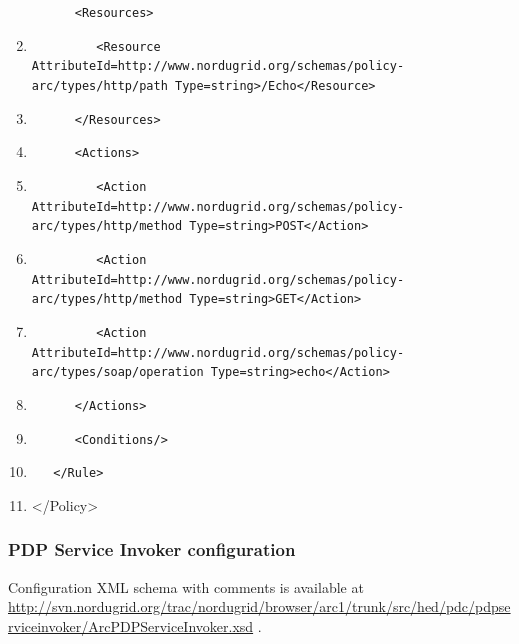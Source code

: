 \documentclass{article}
\begin{document}
\begin{enumerate}
{\texttt{\ \ \ \ \ \ {\textless}Resources{\textgreater}}}
\item {\color{black}
\texttt{\ \ \ \ \ \ \ \ \ {\textless}Resource
AttributeId={\textquotedbl}http://www.nordugrid.org/schemas/policy-arc/types/http/path{\textquotedbl}
Type={\textquotedbl}string{\textquotedbl}{\textgreater}/Echo{\textless}/Resource{\textgreater}}}
\item {\color{black}
\texttt{\ \ \ \ \ \ {\textless}/Resources{\textgreater}}}
\item {\color{black}
\texttt{\ \ \ \ \ \ {\textless}Actions{\textgreater}}}
\item {\color{black}
\texttt{\ \ \ \ \ \ \ \ \ {\textless}Action
AttributeId={\textquotedbl}http://www.nordugrid.org/schemas/policy-arc/types/http/method{\textquotedbl}
Type={\textquotedbl}string{\textquotedbl}{\textgreater}POST{\textless}/Action{\textgreater}}}
\item {\color{black}
\texttt{\ \ \ \ \ \ \ \ \ {\textless}Action
AttributeId={\textquotedbl}http://www.nordugrid.org/schemas/policy-arc/types/http/method{\textquotedbl}
Type={\textquotedbl}string{\textquotedbl}{\textgreater}GET{\textless}/Action{\textgreater}}}
\item {\color{black}
\texttt{\ \ \ \ \ \ \ \ \ {\textless}Action
AttributeId={\textquotedbl}http://www.nordugrid.org/schemas/policy-arc/types/soap/operation{\textquotedbl}
Type={\textquotedbl}string{\textquotedbl}{\textgreater}echo{\textless}/Action{\textgreater}}}
\item {\color{black}
\texttt{\ \ \ \ \ \ {\textless}/Actions{\textgreater}}}
\item {\color{black}
\texttt{\ \ \ \ \ \ {\textless}Conditions/{\textgreater}}}
\item {\color{black}
\texttt{\ \ \ {\textless}/Rule{\textgreater}}}
\item {\ttfamily\color{black}
{\textless}/Policy{\textgreater}}
\end{enumerate}
\subsubsection{PDP Service Invoker configuration}
{\upshape\color{black}
Configuration XML schema with comments is available at
\url{http://svn.nordugrid.org/trac/nordugrid/browser/arc1/trunk/src/hed/pdc/pdpserviceinvoker/ArcPDPServiceInvoker.xsd}
.}
\end{document}
